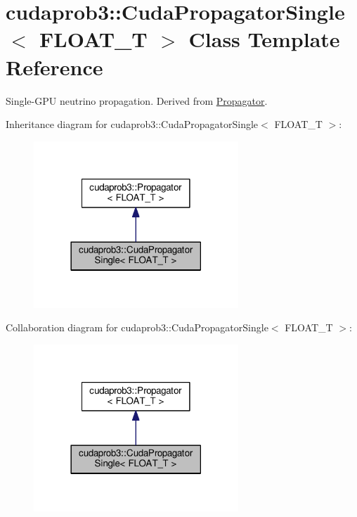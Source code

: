\hypertarget{classcudaprob3_1_1CudaPropagatorSingle}{}\section{cudaprob3\+:\+:Cuda\+Propagator\+Single$<$ F\+L\+O\+A\+T\+\_\+T $>$ Class Template Reference}
\label{classcudaprob3_1_1CudaPropagatorSingle}


Single-\/\+G\+PU neutrino propagation. Derived from \hyperlink{classcudaprob3_1_1Propagator}{Propagator}.  




Inheritance diagram for cudaprob3\+:\+:Cuda\+Propagator\+Single$<$ F\+L\+O\+A\+T\+\_\+T $>$\+:\nopagebreak
\begin{figure}[H]
\begin{center}
\leavevmode
\includegraphics[width=218pt]{classcudaprob3_1_1CudaPropagatorSingle__inherit__graph}
\end{center}
\end{figure}


Collaboration diagram for cudaprob3\+:\+:Cuda\+Propagator\+Single$<$ F\+L\+O\+A\+T\+\_\+T $>$\+:\nopagebreak
\begin{figure}[H]
\begin{center}
\leavevmode
\includegraphics[width=218pt]{classcudaprob3_1_1CudaPropagatorSingle__coll__graph}
\end{center}
\end{figure}

